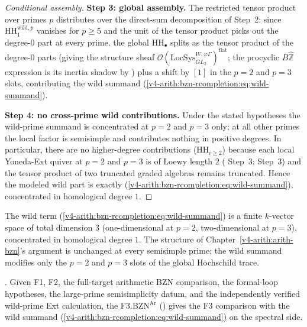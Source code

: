\begin{proof}[Conditional assembly]
\medskip\noindent\textbf{Step 3: global assembly.} The restricted tensor
product over primes \(p\) distributes over the direct-sum
decomposition of Step~2: since \(\mathrm{HH}_{1}^{\mathrm{wild},p}\)
vanishes for \(p\geq 5\) and the unit of the tensor product picks
out the degree-\(0\) part at every prime, the global
\(\mathrm{HH}_{\bullet}\) splits as the tensor product of the
degree-\(0\) parts (giving the structure sheaf
\(\mathcal{O}(\mathrm{LocSys}^{W,\varphi\Gamma}_{GL_{2}})^{\mathrm{flat}}\);
the procyclic \(B\widehat{\mathbb{Z}}\) expression is its inertia
shadow by ) plus a shift by
\([1]\) in the \(p=2\) and \(p=3\) slots, contributing the wild summand
(\ref{v4-arith:bzn-rcompletion:eq:wild-summand}).

\medskip\noindent\textbf{Step 4: no cross-prime wild contributions.} Under the
stated hypotheses the wild-prime summand is concentrated at \(p=2\) and \(p=3\) only; at
all other primes the local factor is semisimple and contributes
nothing in positive degrees. In particular, there are no
higher-degree contributions (\(\mathrm{HH}_{i\geq 2}\)) because
each local Yoneda-Ext quiver at \(p=2\) and \(p=3\) is of Loewy
length \(2\) (
Step~3;  Step~3)
and the tensor product of two truncated graded algebras remains
truncated. Hence the modeled wild part is exactly
(\ref{v4-arith:bzn-rcompletion:eq:wild-summand}), concentrated
in homological degree \(1\).
\end{proof}

\begin{remark}
\label{v4-arith:bzn-rcompletion:rem:domain}
The wild term
(\ref{v4-arith:bzn-rcompletion:eq:wild-summand}) is a finite
\(k\)-vector space of total dimension \(3\) (one-dimensional at \(p=2\),
two-dimensional at \(p=3\)), concentrated in homological degree \(1\).
The structure of Chapter~\ref{v4-arith:arith-bzn}'s argument is
unchanged at every semisimple prime; the wild summand modifies only
the \(p=2\) and \(p=3\) slots of the global Hochschild trace.
\end{remark}

\begin{corollary}
\label{v4-arith:bzn-rcompletion:cor:F3-corrected-closes}
\ClaimStatusConjectured. Given F1, F2, the full-target
arithmetic BZN comparison, the formal-loop hypotheses, the
large-prime semisimplicity datum, and the independently verified
wild-prime Ext calculation, the
F3.BZN\({}^{\mathrm{Ar}}\)
()
gives the F3 comparison with the wild summand
(\ref{v4-arith:bzn-rcompletion:eq:wild-summand}) on the spectral
side.
\end{corollary}


